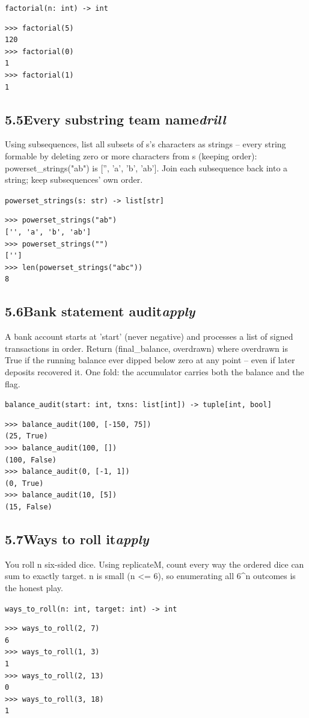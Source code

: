 \documentclass[10pt,letterpaper]{book}
\begin{document}
\noindent\texttt{factorial(n: int) -> int}
\begin{lstlisting}[style=ex]
>>> factorial(5)
120
>>> factorial(0)
1
>>> factorial(1)
1
\end{lstlisting}
\subsection*{5.5\quad Every substring team name\hfill\textnormal{\textit{drill}}}
Using subsequences, list all subsets of s's characters as strings -- every string formable by deleting zero or more characters from s (keeping order): powerset\_strings("ab") is ['', 'a', 'b', 'ab']. Join each subsequence back into a string; keep subsequences' own order.

\noindent\texttt{powerset\_strings(s: str) -> list[str]}
\begin{lstlisting}[style=ex]
>>> powerset_strings("ab")
['', 'a', 'b', 'ab']
>>> powerset_strings("")
['']
>>> len(powerset_strings("abc"))
8
\end{lstlisting}
\subsection*{5.6\quad Bank statement audit\hfill\textnormal{\textit{apply}}}
A bank account starts at 'start' (never negative) and processes a list of signed transactions in order. Return (final\_balance, overdrawn) where overdrawn is True if the running balance ever dipped below zero at any point -- even if later deposits recovered it. One fold: the accumulator carries both the balance and the flag.

\noindent\texttt{balance\_audit(start: int, txns: list[int]) -> tuple[int, bool]}
\begin{lstlisting}[style=ex]
>>> balance_audit(100, [-150, 75])
(25, True)
>>> balance_audit(100, [])
(100, False)
>>> balance_audit(0, [-1, 1])
(0, True)
>>> balance_audit(10, [5])
(15, False)
\end{lstlisting}
\subsection*{5.7\quad Ways to roll it\hfill\textnormal{\textit{apply}}}
You roll n six-sided dice. Using replicateM, count every way the ordered dice can sum to exactly target. n is small (n <= 6), so enumerating all 6\^{}n outcomes is the honest play.

\noindent\texttt{ways\_to\_roll(n: int, target: int) -> int}
\begin{lstlisting}[style=ex]
>>> ways_to_roll(2, 7)
6
>>> ways_to_roll(1, 3)
1
>>> ways_to_roll(2, 13)
0
>>> ways_to_roll(3, 18)
1
\end{lstlisting}
\end{document}
